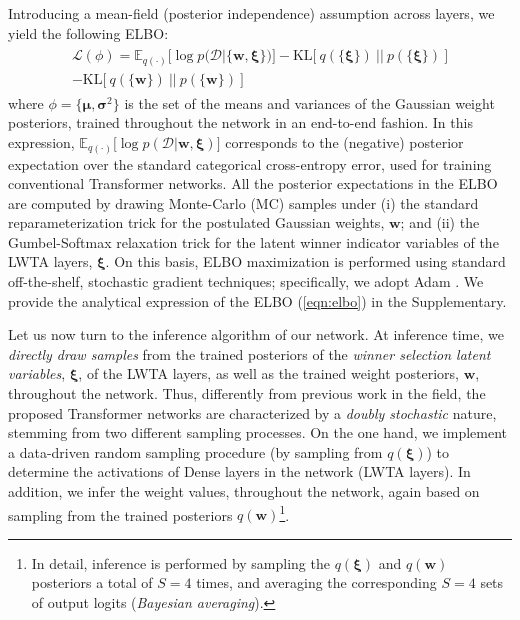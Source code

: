 \documentclass[10pt,twocolumn,letterpaper]{article}
\begin{document}
Introducing a mean-field (posterior independence) assumption across layers, we yield the following ELBO:
\begin{align}
\begin{split}
\mathcal{L}(\phi) = \mathbb{E}_{q(\cdot)}\big[\log p(\mathcal{D}|\{\boldsymbol{w, \xi}\}) \big] - \mathrm{KL} \big[\ q(\{ \boldsymbol \xi \}) \ || \ p(\{ \boldsymbol \xi \})\ \big] \\
- \mathrm{KL} \big[\ q(\{ \boldsymbol{w}\}) \ || \ p(\{\boldsymbol{w}\})\ \big]
\end{split}
\label{eqn:elbo}
\end{align}
where $\phi=\{\boldsymbol{\mu}, \boldsymbol{\sigma}^2\}$ is the set of the means and variances of the Gaussian weight posteriors, trained throughout the network in an end-to-end fashion. In this expression, $\mathbb{E}_{q(\cdot)}\big[\log p(\mathcal{D}|\boldsymbol{w, \xi})\big]$ corresponds to the (negative) posterior expectation over the standard categorical cross-entropy error, used for training conventional Transformer networks. All the posterior expectations in the ELBO are computed by drawing Monte-Carlo (MC) samples under (i) the standard reparameterization trick for the postulated Gaussian weights, $\boldsymbol{w}$; and (ii) the Gumbel-Softmax relaxation trick \cite{Maddison2017,jang2017categorical} for the latent winner indicator variables of the LWTA layers, $\boldsymbol{\xi}$. 
On this basis, ELBO maximization is performed using standard off-the-shelf, stochastic gradient techniques; specifically, we adopt Adam \cite{kingma2014adam}. We provide the analytical expression of the ELBO (\ref{eqn:elbo}) in the Supplementary.

Let us now turn to the inference algorithm of our network. At inference time, we \emph{directly draw samples} from the trained posteriors of the \emph{winner selection latent variables}, $\boldsymbol{\xi}$, of the LWTA layers, as well as the trained weight posteriors, $\boldsymbol{w}$, throughout the network. Thus, differently from previous work in the field, the proposed Transformer networks are characterized by a \emph{doubly stochastic} nature, stemming from two different sampling processes. On the one hand, we implement a data-driven random sampling procedure (by sampling from $q(\boldsymbol{\xi})$) to determine the activations of Dense layers in the network (LWTA layers). In addition, we infer the weight values, throughout the network, again based on sampling from the trained posteriors $q(\boldsymbol{w})$\footnote{In detail, inference is performed by sampling the $q(\boldsymbol{\xi})$ and $q(\boldsymbol{w})$ posteriors a total of $S=4$ times, and averaging the corresponding $S=4$ sets of output logits (\emph{Bayesian averaging}).}.    
\end{document}
